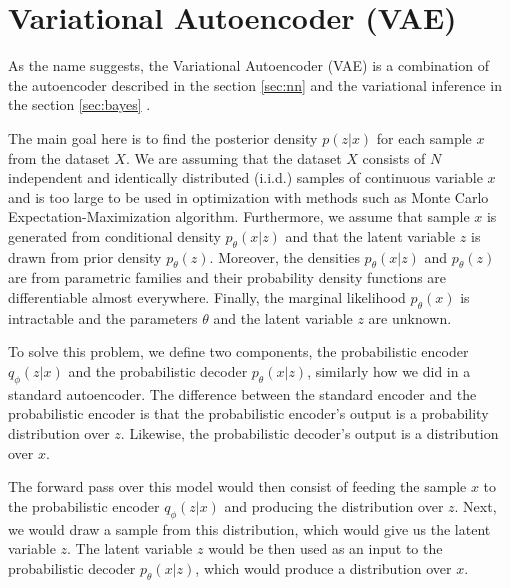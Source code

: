 


\newpage
\section{Variational Autoencoder (VAE)}
As the name suggests, the Variational Autoencoder (VAE) is a combination of the autoencoder described in the section \ref{sec:nn} and the variational inference in the section \ref{sec:bayes} \cite{kingma2013}.

The main goal here is to find the posterior density $p(z|x)$ for each sample $x$ from the dataset $X$.
We are assuming that the dataset $X$ consists of $N$ independent and identically distributed (i.i.d.) samples of continuous variable $x$ and is too large to be used in optimization with methods such as Monte Carlo Expectation-Maximization algorithm.
Furthermore, we assume that sample $x$ is generated from conditional density $p_{\theta}(x|z)$ and that the latent variable $z$ is drawn from prior density $p_{\theta}(z)$.
Moreover, the densities $p_{\theta}(x|z)$ and $p_{\theta}(z)$ are from parametric families and their probability density functions are differentiable almost everywhere.
Finally, the marginal likelihood $p_{\theta}(x)$ is intractable and the parameters $\theta$ and the latent variable $z$ are unknown.

To solve this problem, we define two components, the probabilistic encoder $q_{\phi}(z|x)$ and the probabilistic decoder $p_{\theta}(x|z)$, similarly how we did in a standard autoencoder.
The difference between the standard encoder and the probabilistic encoder is that the probabilistic encoder's output is a probability distribution over $z$.
Likewise, the probabilistic decoder's output is a distribution over $x$.

The forward pass over this model would then consist of feeding the sample $x$ to the probabilistic encoder $q_{\phi}(z|x)$ and producing the distribution over $z$.
Next, we would draw a sample from this distribution, which would give us the latent variable $z$.
The latent variable $z$ would be then used as an input to the probabilistic decoder $p_{\theta}(x|z)$, which would produce a distribution over $x$.

